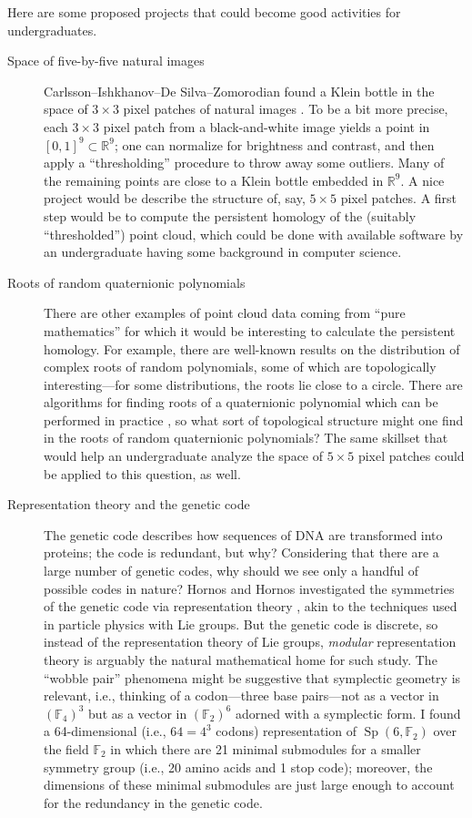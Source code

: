 \documentclass[12pt]{amsart}
\theoremstyle{definition}
\DeclareMathOperator{\Sp}{Sp}
\begin{document}
Here are some proposed projects that could become good activities for
undergraduates.
\begin{description}
\item[Space of five-by-five natural images]
Carlsson--Ishkhanov--De Silva--Zomorodian found a Klein bottle in the
space of $3 \times 3$ pixel patches of natural images
\cite{natural-images}.  To be a bit more precise, each $3 \times 3$
pixel patch from a black-and-white image yields a point in $[0,1]^9
\subset \mathbb{R}^9$; one can normalize for brightness and contrast,
and then apply a ``thresholding'' procedure to throw away some
outliers.  Many of the remaining points are close to a Klein bottle
embedded in $\mathbb{R}^9$.  A nice project would be describe the
structure of, say, $5 \times 5$ pixel patches.  A first step would be
to compute the persistent homology \cite{MR2121296} of the (suitably
``thresholded'') point cloud, which could be done with available
software by an undergraduate having some background in computer
science.

\item[Roots of random quaternionic polynomials]  There are
other examples of point cloud data coming from ``pure mathematics''
for which it would be interesting to calculate the persistent
homology.  For example, there are well-known results on the
distribution of complex roots of random polynomials, some of which are
topologically interesting---for some distributions, the roots lie
close to a circle.  There are algorithms for finding roots of a
quaternionic polynomial \cite{MR6980} which can be performed in
practice \cite{MR1851239}, so what sort of topological structure might
one find in the roots of random quaternionic polynomials?  The same
skillset that would help an undergraduate analyze the space of $5
\times 5$ pixel patches could be applied to this question, as well.

\item[Representation theory and the genetic code] The genetic code describes how sequences of DNA are transformed into proteins; the code is redundant, but why?  Considering that there are a large number of genetic
codes, why should we see only a handful of possible codes in nature?
Hornos and Hornos investigated the symmetries of the genetic code via
representation theory \cite{originalhornos}, akin to the techniques
used in particle physics with Lie groups.  But the genetic code is
discrete, so instead of the representation theory of Lie groups,
\textit{modular} representation theory is arguably the natural
mathematical home for such study.  The ``wobble pair'' phenomena might
be suggestive that symplectic geometry is relevant, i.e., thinking of
a codon---three base pairs---not as a vector in $(\mathbb{F}_4)^3$ but
as a vector in $(\mathbb{F}_2)^6$ adorned with a symplectic form. I
found a 64-dimensional (i.e., $64 = 4^3$ codons) representation of 
$\Sp(6,\mathbb{F}_2)$ over
the field $\mathbb{F}_2$ in which there are 21 minimal submodules for a
smaller symmetry group (i.e., 20 amino acids and 1 stop code);
moreover, the dimensions of these minimal submodules are just large
enough to account for the redundancy in the genetic code.


\end{description}
\end{document}

